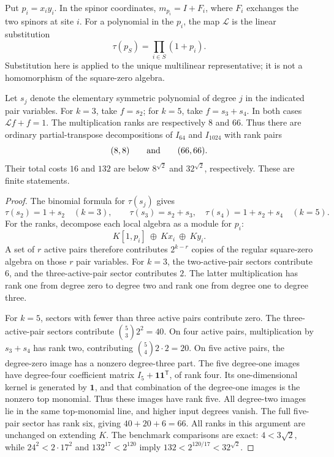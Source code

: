 Put \(p_i=x_i y_i\). In the spinor coordinates,
\(m_{p_i}=I+F_i\), where \(F_i\) exchanges the two spinors at site \(i\).
For a polynomial in the \(p_i\), the map \(\mathcal L\) is the
linear substitution
\[
 \tau(p_S)=\prod_{i\in S}(1+p_i).
\]
Substitution here is applied to the unique multilinear
representative; it is not a homomorphism of the square-zero algebra.

\begin{corollary}
\label{cor:char2-eight-wire}
\label{cor:char2-thirty-two-wire}
Let \(s_j\) denote the elementary symmetric polynomial of degree \(j\)
in the indicated pair variables. For \(k=3\), take \(f=s_2\);
for \(k=5\), take \(f=s_3+s_4\). In both cases
\(\mathcal Lf+f=1\). The multiplication ranks are respectively
\(8\) and \(66\). Thus there are ordinary partial-transpose
decompositions of \(I_{64}\) and \(I_{1024}\) with rank pairs
\[
 (8,8)\qquad\hbox{and}\qquad(66,66).
\]
Their total costs \(16\) and \(132\) are below
\(8^{\sqrt2}\) and \(32^{\sqrt2}\), respectively.
These are finite statements.
\end{corollary}
\begin{proof}
The binomial formula for \(\tau(s_j)\) gives
\[
 \tau(s_2)=1+s_2\quad(k=3),\qquad
 \tau(s_3)=s_2+s_3,\quad
 \tau(s_4)=1+s_2+s_4\quad(k=5).
\]
For the ranks, decompose each local algebra as a module for \(p_i\):
\[
 K[1,p_i]\ \oplus\ Kx_i\ \oplus\ Ky_i.
\]
A set of \(r\) active pairs therefore contributes \(2^{k-r}\)
copies of the regular square-zero algebra on those \(r\) pair variables.
For \(k=3\), the two-active-pair sectors contribute \(6\), and the
three-active-pair sector contributes \(2\). The latter multiplication
has rank one from degree zero to degree two and rank one from degree
one to degree three.

For \(k=5\), sectors with fewer than three active pairs contribute zero.
The three-active-pair sectors contribute
\(\binom53 2^2=40\). On four active pairs, multiplication by
\(s_3+s_4\) has rank two, contributing \(\binom54 2\cdot2=20\).
On five active pairs, the degree-zero image has a nonzero degree-three
part. The five degree-one images have degree-four coefficient matrix
\(I_5+\mathbf1\mathbf1^{\mathsf T}\), of rank four. Its
one-dimensional kernel is generated by \(\mathbf1\), and that
combination of the degree-one images is the nonzero top monomial.
Thus these images have rank five. All degree-two images lie in the
same top-monomial line, and higher input degrees vanish. The full
five-pair sector has rank six, giving \(40+20+6=66\).
All ranks in this argument are unchanged on extending \(K\).
The benchmark comparisons are exact: \(4<3\sqrt2\), while
\(24^2<2\cdot17^2\) and \(132^{17}<2^{120}\) imply
\(132<2^{120/17}<32^{\sqrt2}\).
\end{proof}


